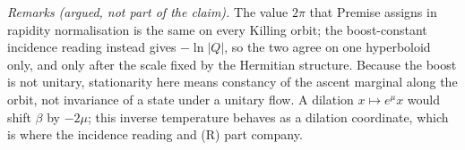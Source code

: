 \emph{Remarks (argued, not part of the claim).} The value $2\pi$ that Premise  assigns in rapidity normalisation is the same on every Killing orbit; the boost-constant incidence reading instead gives $-\ln|Q|$, so the two agree on one hyperboloid only, and only after the scale fixed by the Hermitian structure. Because the boost is not unitary, stationarity here means constancy of the ascent marginal along the orbit, not invariance of a state under a unitary flow. A dilation $x \mapsto e^{\mu}x$ would shift $\beta$ by $-2\mu$; this inverse temperature behaves as a dilation coordinate, which is where the incidence reading and (R) part company.
